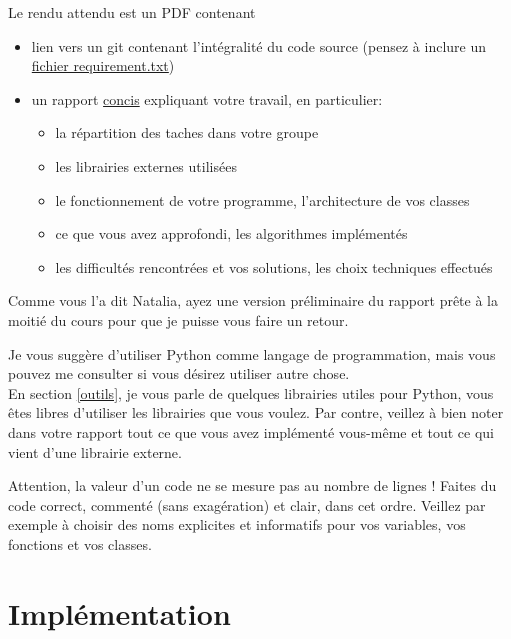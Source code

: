 \documentclass{article}
\begin{document}
\noindent Le rendu attendu est un PDF contenant
\begin{itemize}
    \item lien vers un git contenant l'intégralité du code source (pensez à inclure un \href{https://pip.pypa.io/en/stable/user_guide/#requirements-files}{fichier requirement.txt})
    \item un rapport \underline{concis} expliquant votre travail, en particulier:
    \begin{itemize}
        \item la répartition des taches dans votre groupe
        \item les librairies externes utilisées
        \item le fonctionnement de votre programme, l'architecture de vos classes
        \item ce que vous avez approfondi, les algorithmes implémentés
        \item les difficultés rencontrées et vos solutions, les choix techniques effectués
    \end{itemize}
\end{itemize}
Comme vous l'a dit Natalia, ayez une version préliminaire du rapport prête à la moitié du cours pour que je puisse vous faire un retour.

\vspace{1em}

\noindent Je vous suggère d'utiliser Python comme langage de programmation, mais vous pouvez me consulter si vous désirez utiliser autre chose. \\
En section \ref{outils}, je vous parle de quelques librairies utiles pour Python, vous êtes libres d'utiliser les librairies que vous voulez. Par contre, veillez à bien noter dans votre rapport tout ce que vous avez implémenté vous-même et tout ce qui vient d'une librairie externe.

Attention, la valeur d'un code ne se mesure pas au nombre de lignes ! Faites du code correct, commenté (sans exagération) et clair, dans cet ordre. Veillez par exemple à choisir des noms explicites et informatifs pour vos variables, vos fonctions et vos classes.

\section{Implémentation}
\end{document}
